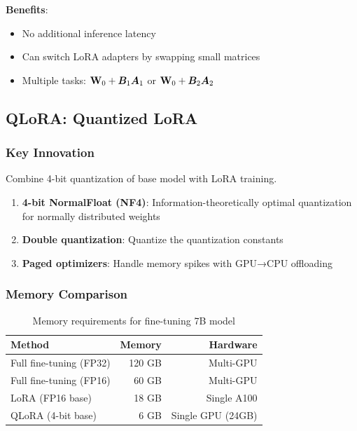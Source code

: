 \textbf{Benefits}:
\begin{itemize}
    \item No additional inference latency
    \item Can switch LoRA adapters by swapping small matrices
    \item Multiple tasks: $\mathbf{W}_0 + \bm{B}_1 \bm{A}_1$ or $\mathbf{W}_0 + \bm{B}_2 \bm{A}_2$
\end{itemize}

\subsection{QLoRA: Quantized LoRA}

\subsubsection{Key Innovation}

Combine 4-bit quantization of base model with LoRA training.

\begin{enumerate}
    \item \textbf{4-bit NormalFloat (NF4)}: Information-theoretically optimal quantization for normally distributed weights
    
    \item \textbf{Double quantization}: Quantize the quantization constants
    
    \item \textbf{Paged optimizers}: Handle memory spikes with GPU→CPU offloading
\end{enumerate}

\subsubsection{Memory Comparison}

\begin{table}[H]
\centering
\caption{Memory requirements for fine-tuning 7B model}
\begin{tabular}{lrr}
\toprule
\textbf{Method} & \textbf{Memory} & \textbf{Hardware} \\
\midrule
Full fine-tuning (FP32) & ~120 GB & Multi-GPU \\
Full fine-tuning (FP16) & ~60 GB & Multi-GPU \\
LoRA (FP16 base) & ~18 GB & Single A100 \\
QLoRA (4-bit base) & ~6 GB & Single GPU (24GB) \\
\bottomrule
\end{tabular}
\end{table}

